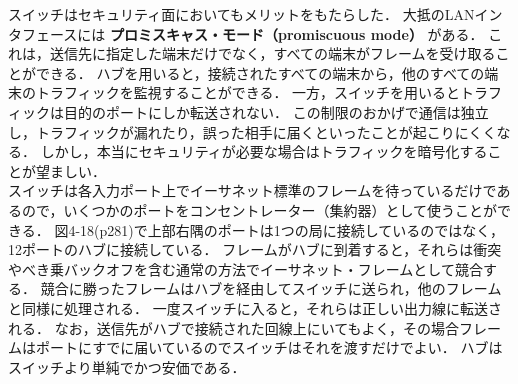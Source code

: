 \documentclass[a4paper]{ltjsarticle}
\begin{document}
スイッチはセキュリティ面においてもメリットをもたらした．
大抵のLANインタフェースには \textbf{プロミスキャス・モード（promiscuous
mode）} がある．
これは，送信先に指定した端末だけでなく，すべての端末がフレームを受け取ることができる．
ハブを用いると，接続されたすべての端末から，他のすべての端末のトラフィックを監視することができる．
一方，スイッチを用いるとトラフィックは目的のポートにしか転送されない．
この制限のおかげで通信は独立し，トラフィックが漏れたり，誤った相手に届くといったことが起こりにくくなる．
しかし，本当にセキュリティが必要な場合はトラフィックを暗号化することが望ましい．\\
スイッチは各入力ポート上でイーサネット標準のフレームを待っているだけであるので，いくつかのポートをコンセントレーター（集約器）として使うことができる．
図4-18(p281)で上部右隅のポートは1つの局に接続しているのではなく，12ポートのハブに接続している．
フレームがハブに到着すると，それらは衝突やべき乗バックオフを含む通常の方法でイーサネット・フレームとして競合する．
競合に勝ったフレームはハブを経由してスイッチに送られ，他のフレームと同様に処理される．
一度スイッチに入ると，それらは正しい出力線に転送される．
なお，送信先がハブで接続された回線上にいてもよく，その場合フレームはポートにすでに届いているのでスイッチはそれを渡すだけでよい．
ハブはスイッチより単純でかつ安価である．
\end{document}
